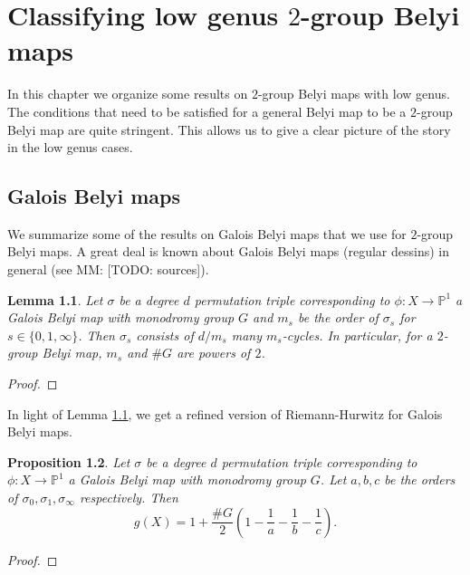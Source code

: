 \documentclass{dcthesis}
\newcommand{\PP}{\mathbb P}
\newcommand{\mm}[1]{{\color{blue} \sf MM: [#1]}}
\newtheorem{prop}{Proposition}[section]
\newtheorem{lemma}[prop]{Lemma}
\theoremstyle{definition}
\theoremstyle{remark}
\numberwithin{equation}{section}
\numberwithin{figure}{section}
\begin{document}
\chapter{Classifying low genus $2$-group Belyi maps}{\label{chapter:classify}
  In this chapter we organize some results on $2$-group Belyi maps
  with low genus.
  The conditions that need to be satisfied for a general Belyi map
  to be a $2$-group Belyi map are quite stringent.
  This allows us to give a clear picture of the story in the low genus cases.
  \section{Galois Belyi maps}{\label{sec:galoisbelyimaps}
    We summarize some of the results on Galois Belyi maps
    that we use for $2$-group Belyi maps.
    A great deal is known about Galois Belyi maps (regular dessins) in general
    (see \mm{TODO: sources}).
    \begin{lemma}\label{lem:regular}
      Let $\sigma$ be a degree $d$ permutation triple corresponding to
      $\phi\colon X\to\PP^1$ a Galois Belyi map with monodromy group $G$
      and
      $m_s$ be the order of $\sigma_s$ for $s\in\{0,1,\infty\}$.
      Then $\sigma_s$ consists of $d/m_s$ many $m_s$-cycles.
      In particular,
      for a $2$-group Belyi map,
      $m_s$ and $\#G$ are powers of $2$.
    \end{lemma}
    \begin{proof}
    \end{proof}
    In light of Lemma \ref{lem:regular},
    we get a refined version of Riemann-Hurwitz for Galois Belyi maps.
    \begin{prop}\label{prop:riemannhurwitzgalois}
      Let $\sigma$ be a degree $d$ permutation triple corresponding to
      $\phi\colon X\to\PP^1$ a Galois Belyi map with monodromy group $G$.
      Let $a,b,c$ be the orders of $\sigma_0,\sigma_1,\sigma_\infty$
      respectively.
      Then
      \begin{equation}\label{eqn:riemannhurwitzgalois}
        g(X) = 1+\frac{\#G}{2}\left(1-\frac{1}{a}-\frac{1}{b}-\frac{1}{c}\right).
      \end{equation}
    \end{prop}
    \begin{proof}
    \end{proof}
  }
}
\end{document}
